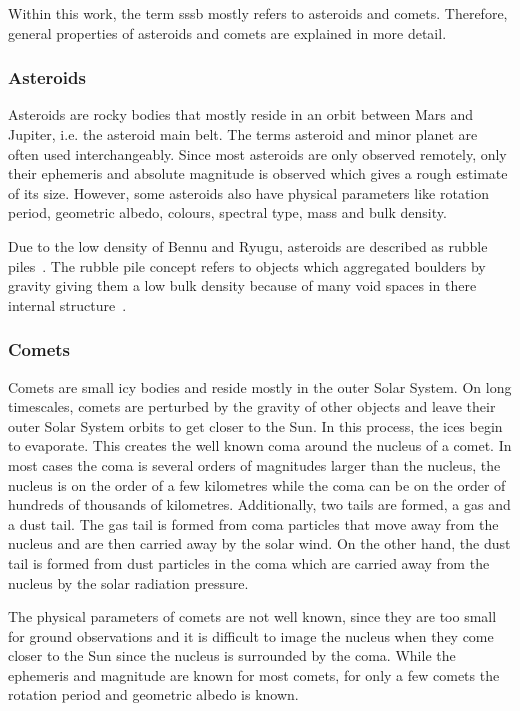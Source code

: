 Within this work, the term \gls{sssb} mostly refers to asteroids and comets. Therefore, general properties of asteroids and comets are explained in more detail.

\subsubsection{Asteroids}
Asteroids are rocky bodies that mostly reside in an orbit between Mars and Jupiter, i.e. the asteroid main belt. The terms asteroid and minor planet are often used interchangeably. Since most asteroids are only observed remotely, only their ephemeris and absolute magnitude is observed which gives a rough estimate of its size. However, some asteroids also have physical parameters like rotation period, geometric albedo, colours, spectral type, mass and bulk density.

Due to the low density of Bennu and Ryugu, asteroids are described as rubble piles~\cite{Chesley2014OrbitBennu, Watanabe2019Hayabusa2Pile}. The rubble pile concept refers to objects which aggregated boulders by gravity giving them a low bulk density because of many void spaces in there internal structure~\cite{Richardson2002GravitationalEvolution}.

\subsubsection{Comets}
Comets are small icy bodies and reside mostly in the outer Solar System. On long timescales, comets are perturbed by the gravity of other objects and leave their outer Solar System orbits to get closer to the Sun. In this process, the ices begin to evaporate. This creates the well known coma around the nucleus of a comet. In most cases the coma is several orders of magnitudes larger than the nucleus, the nucleus is on the order of a few kilometres while the coma can be on the order of hundreds of thousands of kilometres. Additionally, two tails are formed, a gas and a dust tail. The gas tail is formed from coma particles that move away from the nucleus and are then carried away by the solar wind. On the other hand, the dust tail is formed from dust particles in the coma which are carried away from the nucleus by the solar radiation pressure.

The physical parameters of comets are not well known, since they are too small for ground observations and it is difficult to image the nucleus when they come closer to the Sun since the nucleus is surrounded by the coma. While the ephemeris and magnitude are known for most comets, for only a few comets the rotation period and geometric albedo is known.

